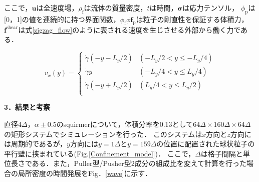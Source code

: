 \documentclass[twocolumns,10pt,a4j]{jarticle}
\begin{document}
  \noindent
ここで，$\boldsymbol{u}$は全速度場，$\rho_\mathrm{f}$は流体の質量密度，$t$は時間，$\boldsymbol{\sigma}$は応力テンソル，
$\phi_\mathrm{p}$は[0，1]の値を連続的に持つ界面関数，$\phi_\mathrm{f} \phi \boldsymbol{f}_\mathrm{p}$は粒子の剛直性を保証する体積力，
$\boldsymbol{f}^\mathrm{shear}$は式\eqref{zigzag_flow}のように表される速度を生じさせる外部から働く力である．
  \par
  \vspace{-4truemm}
  \begin{equation}
    v_x(y) =
    \begin{cases}
      \dot{\gamma} (-y - L_y/2) & (-L_y/2 < y \le -L_y/4) \\
      \dot{\gamma} y            & (-L_y/4 < y \le L_y/4) \\
      \dot{\gamma} (-y + L_y/2) & (L_y/4 < y \le L_y/2)\\
    \end{cases}
    \label{zigzag_flow}
  \end{equation}
  \vspace{-4truemm}


  \noindent
  {\bf \large 3．結果と考察}
  \par
直径$4\Delta$，$\alpha\pm0.5$のsquirmerについて，体積分率を0.13として$64\Delta×\!\!160\Delta×\!\!64\Delta$の矩形システムでシミュレーションを行った．
このシステムは$x$方向と$z$方向には周期的であるが，$y$方向には$y =1\Delta$と$y=159\Delta$の位置に配置された球状粒子の平行壁に挟まれている(Fig.\ref{Confinement_model})．
ここで，$\Delta$は格子間隔と単位長さである．また，Puller型/Pusher型2成分の組成比を変えて計算を行った場合の局所密度の時間発展をFig．\ref{wave}に示す．


\end{document}
